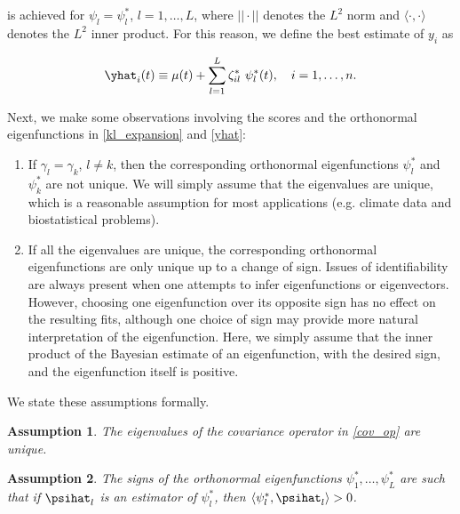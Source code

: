 \documentclass[12pt]{article}
\theoremstyle{plain}
\newtheorem{assumption}{Assumption}
\theoremstyle{definition}
\theoremstyle{remark}
\begin{document}
\noindent is achieved for $\psi_l = \psi^*_l$, $l = 1, \dots, L$, where $|| \cdot ||$ denotes the $L^2$ norm and
$\langle \cdot, \cdot \rangle$ denotes the $L^2$ inner product. For this reason, we define the best estimate of
$y_i$ as

\begin{equation}
	\yhat_i (t) \equiv \mu (t) + \sum_{l=1}^L \zeta^*_{il} \ \psi^*_l (t), \quad i = 1, \dots, n.
\label{yhat}
\end{equation}

Next, we make some observations involving the scores and the orthonormal eigenfunctions in \eqref{kl_expansion}
and \eqref{yhat}:

\begin{enumerate}
	\item If $\gamma_l = \gamma_k$, $l \neq k$, then the corresponding orthonormal
	eigenfunctions $\psi^*_l$ and $\psi^*_k$
	are not unique. We will simply assume that the eigenvalues are unique, which is a reasonable assumption
	for most applications (e.g. climate data
	and biostatistical problems).
	\item If all the eigenvalues are unique, the corresponding orthonormal eigenfunctions are only unique up to
	a change of sign. Issues of identifiability are always present when one attempts to infer eigenfunctions or
	eigenvectors. However, choosing one eigenfunction over its opposite sign has no effect on the resulting fits,
	although one choice of sign may provide more natural interpretation of the eigenfunction.
	Here, we simply assume that the inner product of the Bayesian estimate of an
	eigenfunction, with the desired sign, and the eigenfunction itself is positive.
\end{enumerate}

\noindent We state these assumptions formally.

\begin{assumption}
	
	The eigenvalues of the covariance operator in \eqref{cov_op} are unique.
	
\label{asspn:scores}
\end{assumption}

\begin{assumption}
	
	The signs of the orthonormal eigenfunctions $\psi^*_1, \dots, \psi^*_L$ are such that if $\psihat_l$ is an
	estimator of $\psi^*_l$, then $\langle \psi^*_l , \psihat_l \rangle > 0$.
	
\label{asspn:signs}
\end{assumption}
\end{document}
